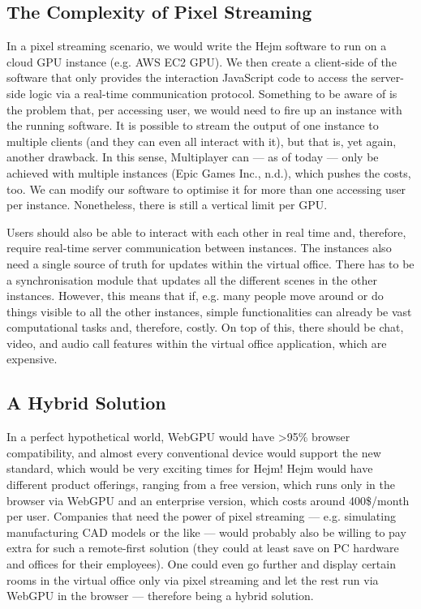 \documentclass[10pt]{article}
\begin{document}
\begin{sloppypar}
  \subsection{The Complexity of Pixel Streaming}
  \label{subsec:the-complexity-of-pixel-streaming}

  In a pixel streaming scenario, we would write the Hejm software to run on a cloud GPU instance (e.g. AWS EC2 GPU). We then create a client-side of the software that only provides the interaction JavaScript code to access the server-side logic via a real-time communication protocol. Something to be aware of is the problem that, per accessing user, we would need to fire up an instance with the running software. It is possible to stream the output of one instance to multiple clients (and they can even all interact with it), but that is, yet again, another drawback. In this sense, Multiplayer can — as of today — only be achieved with multiple instances (Epic Games Inc., n.d.), which pushes the costs, too. We can modify our software to optimise it for more than one accessing user per instance. Nonetheless, there is still a vertical limit per GPU.

  Users should also be able to interact with each other in real time and, therefore, require real-time server communication between instances. The instances also need a single source of truth for updates within the virtual office. There has to be a synchronisation module that updates all the different scenes in the other instances. However, this means that if, e.g. many people move around or do things visible to all the other instances, simple functionalities can already be vast computational tasks and, therefore, costly. On top of this, there should be chat, video, and audio call features within the virtual office application, which are expensive.

  \subsection{A Hybrid Solution}
  \label{subsec:a-hybrid-solution}

  In a perfect hypothetical world, WebGPU would have >95\% browser compatibility, and almost every conventional device would support the new standard, which would be very exciting times for Hejm! Hejm would have different product offerings, ranging from a free version, which runs only in the browser via WebGPU and an enterprise version, which costs around 400\$/month per user. Companies that need the power of pixel streaming — e.g. simulating manufacturing CAD models or the like — would probably also be willing to pay extra for such a remote-first solution (they could at least save on PC hardware and offices for their employees). One could even go further and display certain rooms in the virtual office only via pixel streaming and let the rest run via WebGPU in the browser — therefore being a hybrid solution.


\end{sloppypar}
\end{document}
